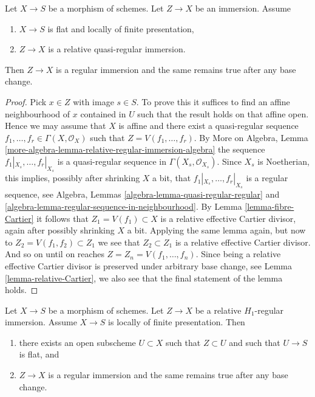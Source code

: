 \begin{lemma}
\label{lemma-relative-regular-immersion-flat-in-neighbourhood}
Let $X \to S$ be a morphism of schemes.
Let $Z \to X$ be an immersion.
Assume
\begin{enumerate}
\item $X \to S$ is flat and locally of finite presentation,
\item $Z \to X$ is a relative quasi-regular immersion.
\end{enumerate}
Then $Z \to X$ is a regular immersion and
the same remains true after any base change.
\end{lemma}

\begin{proof}
Pick $x \in Z$ with image $s \in S$. To prove this it suffices to
find an affine neighbourhood of $x$ contained in $U$ such that the
result holds on that affine open. Hence we may assume that $X$ is affine
and there exist a quasi-regular sequence
$f_1, \ldots, f_r \in \Gamma(X, \mathcal{O}_X)$
such that $Z = V(f_1, \ldots, f_r)$. By
More on Algebra, Lemma
\ref{more-algebra-lemma-relative-regular-immersion-algebra}
the sequence $f_1|_{X_s}, \ldots, f_r|_{X_s}$ is a
quasi-regular sequence in $\Gamma(X_s, \mathcal{O}_{X_s})$.
Since $X_s$ is Noetherian, this implies, possibly after shrinking
$X$ a bit, that $f_1|_{X_s}, \ldots, f_r|_{X_s}$ is a regular
sequence, see
Algebra, Lemmas \ref{algebra-lemma-quasi-regular-regular} and
\ref{algebra-lemma-regular-sequence-in-neighbourhood}.
By
Lemma \ref{lemma-fibre-Cartier}
it follows that $Z_1 = V(f_1) \subset X$ is a relative effective
Cartier divisor, again after possibly shrinking $X$ a bit.
Applying the same lemma again, but now to $Z_2 = V(f_1, f_2) \subset Z_1$
we see that $Z_2 \subset Z_1$ is a relative effective Cartier divisor.
And so on until on reaches $Z = Z_n = V(f_1, \ldots, f_n)$.
Since being a relative effective Cartier divisor is preserved under
arbitrary base change, see
Lemma \ref{lemma-relative-Cartier},
we also see that the final statement of the lemma holds.
\end{proof}

\begin{lemma}
\label{lemma-flat-relative-H1-regular}
Let $X \to S$ be a morphism of schemes.
Let $Z \to X$ be a relative $H_1$-regular immersion.
Assume $X \to S$ is locally of finite presentation. Then
\begin{enumerate}
\item there exists an open subscheme $U \subset X$ such that
$Z \subset U$ and such that $U \to S$ is flat, and
\item $Z \to X$ is a regular immersion and the same remains
true after any base change.
\end{enumerate}
\end{lemma}

